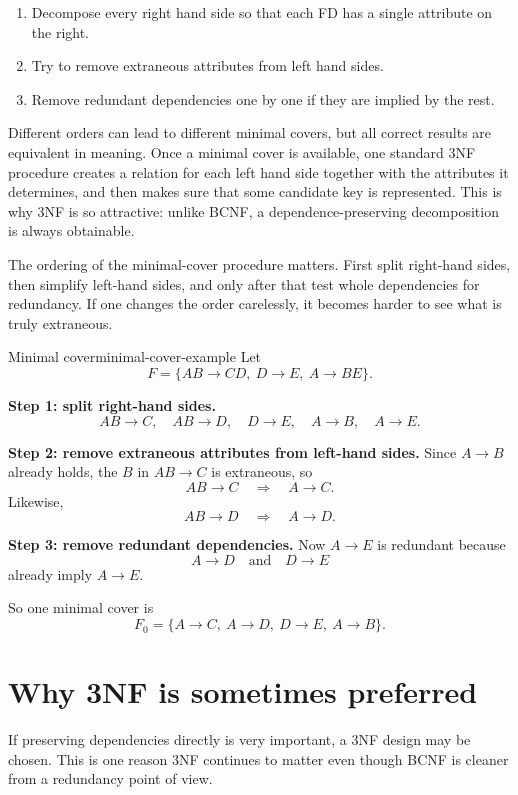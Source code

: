 \documentclass[11pt,a4paper,openany]{book}
\begin{document}
\begin{enumerate}
\item Decompose every right hand side so that each FD has a single attribute on the right.
\item Try to remove extraneous attributes from left hand sides.
\item Remove redundant dependencies one by one if they are implied by the rest.
\end{enumerate}

Different orders can lead to different minimal covers, but all correct results are equivalent in meaning. Once a minimal cover is available, one standard 3NF procedure creates a relation for each left hand side together with the attributes it determines, and then makes sure that some candidate key is represented. This is why 3NF is so attractive: unlike BCNF, a dependence-preserving decomposition is always obtainable.

The ordering of the minimal-cover procedure matters. First split right-hand sides, then simplify left-hand sides, and only after that test whole dependencies for redundancy. If one changes the order carelessly, it becomes harder to see what is truly extraneous.

\begin{example}{Minimal cover}{minimal-cover-example}
Let
\[
F=\{AB \to CD,\ D\to E,\ A\to BE\}.
\]

\textbf{Step 1: split right-hand sides.}
\[
AB\to C,\quad AB\to D,\quad D\to E,\quad A\to B,\quad A\to E.
\]

\textbf{Step 2: remove extraneous attributes from left-hand sides.}
Since \(A\to B\) already holds, the \(B\) in \(AB\to C\) is extraneous, so
\[
AB\to C \quad\Rightarrow\quad A\to C.
\]
Likewise,
\[
AB\to D \quad\Rightarrow\quad A\to D.
\]

\textbf{Step 3: remove redundant dependencies.}
Now \(A\to E\) is redundant because
\[
A\to D \quad\text{and}\quad D\to E
\]
already imply \(A\to E\).

So one minimal cover is
\[
F_0=\{A\to C,\ A\to D,\ D\to E,\ A\to B\}.
\]
\end{example}

\section{Why 3NF is sometimes preferred}
If preserving dependencies directly is very important, a 3NF design may be chosen. This is one reason 3NF continues to matter even though BCNF is cleaner from a redundancy point of view.
\end{document}
